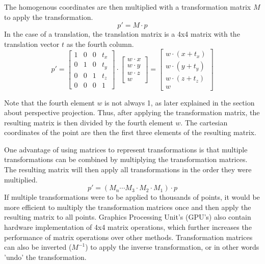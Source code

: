 The homogenous coordinates are then multiplied with a transformation matrix $M$ to apply the transformation.
\begin{equation}
    p' = M \cdot p
\end{equation}
In the case of a translation, the translation matrix is a 4x4 matrix with the translation vector $t$ as the fourth column.
\begin{equation}
    p' = \begin{bmatrix}
             1 & 0 & 0 & t_x \\
             0 & 1 & 0 & t_y \\
             0 & 0 & 1 & t_z \\
             0 & 0 & 0 & 1
    \end{bmatrix} \cdot \begin{bmatrix}
                            w \cdot x \\
                            w \cdot y \\
                            w \cdot z \\
                            w
    \end{bmatrix} = \begin{bmatrix}
                        w \cdot (x + t_x) \\
                        w \cdot (y + t_y) \\
                        w \cdot (z + t_z) \\
                        w
    \end{bmatrix}
\end{equation}

Note that the fourth element $w$ is not always 1, as later explained in the section about perspective projection.
Thus, after applying the transformation matrix, the resulting matrix is then divided by the fourth element $w$.
The cartesian coordinates of the point are then the first three elements of the resulting matrix.

One advantage of using matrices to represent transformations is that multiple transformations can be combined by
multiplying the transformation matrices.
The resulting matrix will then apply all transformations in the order they were multiplied.
\begin{equation}
    p' = (M_n \cdots M_3 \cdot M_2 \cdot M_1) \cdot p
\end{equation}
If multiple transformations were to be applied to thousands of points,
it would be more efficient to multiply the transformation matrices once and then apply the resulting matrix to all points.
Graphics Processing Unit's (GPU's) also contain hardware implementation of 4x4 matrix operations,
which further increases the performance of matrix operations over other methods.
Transformation matrices can also be inverted ($M^{-1}$) to apply the inverse transformation, or in other words 'undo' the transformation.


